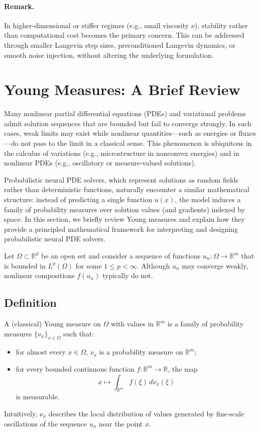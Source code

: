 \documentclass[11pt]{article}
\begin{document}
\paragraph{Remark.}
In higher-dimensional or stiffer regimes (e.g., small viscosity \(\nu\)), stability rather than computational cost becomes the primary concern. This can be addressed through smaller Langevin step sizes, preconditioned Langevin dynamics, or smooth noise injection, without altering the underlying formulation.


\section{Young Measures: A Brief Review}
Many nonlinear partial differential equations (PDEs) and variational problems admit solution sequences that are bounded but fail to converge strongly. In such cases, weak limits may exist while nonlinear quantities---such as energies or fluxes---do not pass to the limit in a classical sense. This phenomenon is ubiquitous in the calculus of variations (e.g., microstructure in nonconvex energies) and in nonlinear PDEs (e.g., oscillatory or measure-valued solutions).

Probabilistic neural PDE solvers, which represent solutions as random fields rather than deterministic functions, naturally encounter a similar mathematical structure: instead of predicting a single function $u(x)$, the model induces a family of probability measures over solution values (and gradients) indexed by space. In this section, we briefly review Young measures and explain how they provide a principled mathematical framework for interpreting and designing probabilistic neural PDE solvers.

Let $\Omega \subset \mathbb{R}^d$ be an open set and consider a sequence of functions $u_n : \Omega \to \mathbb{R}^m$ that is bounded in $L^p(\Omega)$ for some $1 \le p < \infty$. Although $u_n$ may converge weakly, nonlinear compositions $f(u_n)$ typically do not.

\subsection{Definition}
A (classical) Young measure on $\Omega$ with values in $\mathbb{R}^m$ is a family of probability measures $\{\nu_x\}_{x \in \Omega}$ such that:
\begin{itemize}[itemsep=-2pt]
\item for almost every $x \in \Omega$, $\nu_x$ is a probability measure on $\mathbb{R}^m$;
\item for every bounded continuous function $f : \mathbb{R}^m \to \mathbb{R}$, the map
\[
x \mapsto \int_{\mathbb{R}^m} f(\xi) \, d\nu_x(\xi)
\]
is measurable.
\end{itemize}
Intuitively, $\nu_x$ describes the local distribution of values generated by fine-scale oscillations of the sequence $u_n$ near the point $x$.
\end{document}
